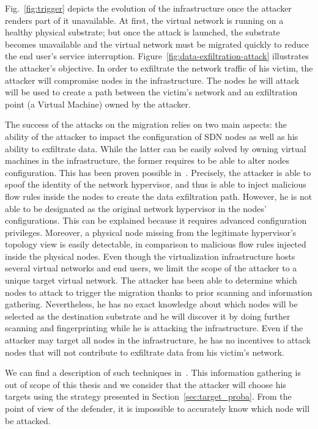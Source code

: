 \label{sec:attack_model}
Fig.~\ref{fig:trigger} depicts the evolution of the infrastructure once the attacker renders part of it unavailable. 
At first, the virtual network is running on a healthy physical substrate; but once the attack is launched, the substrate becomes unavailable and the virtual network must be migrated quickly to reduce the end user's service interruption.
Figure~\ref{fig:data-exfiltration-attack} illustrates the attacker's objective.
In order to exfiltrate the network traffic of his victim, the attacker will compromise nodes in the infrastructure. The nodes he will attack will be used to create a path between the victim's network and an exfiltration point (\eg a Virtual Machine) owned by the attacker.

The success of the attacks on the migration relies on two main aspects: the ability of the attacker to impact the configuration of SDN nodes as well as his ability to exfiltrate data.
While the latter can be easily solved by owning virtual machines in the infrastructure, the former requires to be able to alter nodes configuration. This has been proven possible in~\cite{Taxonomy_Hizver2015, Bokani2015, attain-Ujcich2017}.
Precisely, the attacker is able to spoof the identity of the network hypervisor, and thus is able to inject malicious flow rules inside the nodes to create the data exfiltration path. 
However, he is not able to be designated as the original network hypervisor in the nodes' configurations. 
This can be explained because it requires advanced configuration privileges. Moreover, a physical node missing from the legitimate hypervisor's topology view is easily detectable, in comparison to malicious flow rules injected inside the physical nodes.
Even though the virtualization infrastructure hosts several virtual networks and end users, we limit the scope of the attacker to a unique target virtual network. 
The attacker has been able to determine which nodes to attack to trigger the migration thanks to prior scanning and information gathering. 
Nevertheless, he has no exact knowledge about which nodes will be selected as the destination substrate and he will discover it by doing further scanning and fingerprinting  while he is attacking the infrastructure.  
Even if the attacker may target all nodes in the infrastructure, he has no incentives to attack nodes that will not contribute to exfiltrate data from his victim's network. 

We can find a description of such techniques in~\cite{Hong2015,Sphinx-Dhawan2015}.
This information gathering is out of scope of this thesis and we consider that the attacker will choose his targets using the strategy presented in Section~\ref{sec:target_proba}.
From the point of view of the defender, it is impossible to accurately know which node will be attacked.


